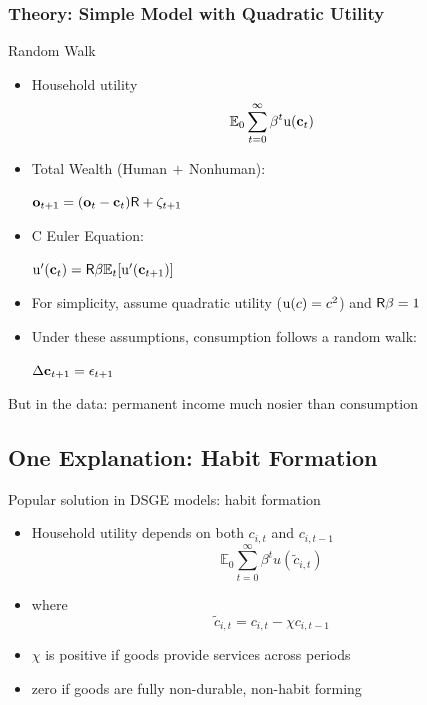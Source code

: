 \documentclass[10pt,english,t,10pt]{beamer}
\newcommand{\jemph}[1]{{\color{StataDarkBlue}#1}}
\providecommand{\jemph}[1]{{\color{jirkasblue}#1}}
\begin{document}
\begin{frame}
\frametitle{Theory: Simple Model with Quadratic Utility }

\begin{block}{\cite{hallRandomWalk} Random Walk}
	\begin{itemize}
		\item Household utility 
		\[
		\mathbb{E}_{0}\sum_{t=0}^{\infty}\beta^{t}{\mathrm{u}}(\mathbf{c}_{t})
		\]
		
		\pause
		\item \jemph{Total Wealth} (Human$\,+\,$Nonhuman):\\
		\begin{center}
			{$\mathbf{o}_{t+1} = (\mathbf{o}_{t}-\mathbf{c}_{t})\mathsf{R}+\zeta_{t+1}$}
		\end{center}\vfill
	\pause
	
		\item \jemph{C Euler Equation}: \\
		\begin{center}
			{${\mathrm{u}}^{\prime}(\mathbf{c}_{t}) = \mathsf{R}\beta \mathbb{E}_{t}[{\mathrm{u}}^{\prime}(\mathbf{c}_{t+1})]$}
		\end{center}\vfill
	\pause
	\item For simplicity, assume quadratic utility (${\mathrm{u}}(c) = c^2$) and $\mathsf{R}\beta=1$ \vfill
	\pause
		\item Under these assumptions, consumption follows a \jemph{random walk}: \\
		\begin{center}
			{$\Delta \mathbf{c}_{t+1} = \epsilon_{t+1}$}
		\end{center}
	\end{itemize}
\end{block}

\pause
But in the data: permanent income much nosier than consumption

\end{frame}



\subsection{One Explanation: Habit Formation}
\begin{frame}{Popular solution in DSGE models: habit formation}

\begin{itemize}
\item <+->Household utility depends on both $c_{i, t}$ and $c_{i, t-1}$
\[
\mathbb{E}_{0}\sum_{t=0}^{\infty}\beta^{t}u(\tilde{c}_{i,t})
\]
\item where 
\[
\tilde{c}_{i,t}=c_{i,t}-\chi c_{i,t-1}
\]
\vfill\vfill
\item $\chi$ is positive if goods provide services across periods 
\item zero if goods are fully non-durable, non-habit forming
\end{itemize}

\end{frame}
\end{document}
